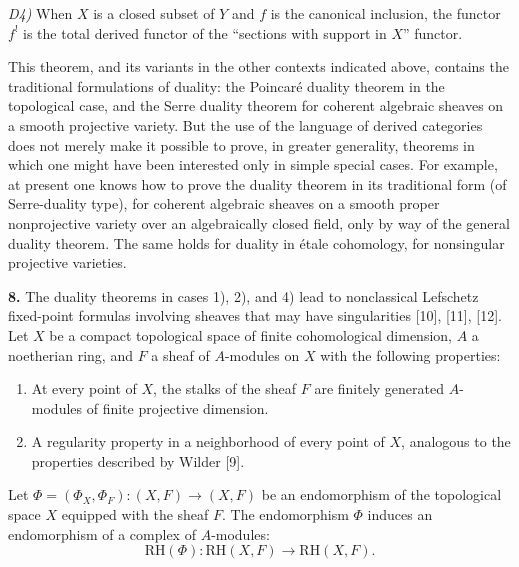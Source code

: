 %
\noindent\textit{D4)} When $X$ is a closed subset of $Y$ and $f$ is the
canonical inclusion, the functor $f^!$ is the total derived functor of the
“sections with support in $X$” functor.

This theorem, and its variants in the other contexts indicated above,
contains the traditional formulations of duality: the Poincaré duality
theorem in the topological case, and the Serre duality theorem for coherent
algebraic sheaves on a smooth projective variety. But the use of the language
of derived categories does not merely make it possible to prove, in greater
generality, theorems in which one might have been interested only in simple
special cases. For example, at present one knows how to prove the duality
theorem in its traditional form (of Serre-duality type), for coherent
algebraic sheaves on a smooth proper nonprojective variety over an
algebraically closed field, only by way of the general duality theorem. The
same holds for duality in étale cohomology, for nonsingular projective
varieties.

\noindent\textbf{8.}\quad
The duality theorems in cases 1), 2), and 4) lead to nonclassical Lefschetz
fixed-point formulas involving sheaves that may have singularities [10],
[11], [12]. Let $X$ be a compact topological space of finite cohomological
dimension, $A$ a noetherian ring, and $F$ a sheaf of $A$-modules on $X$ with
the following properties:

\begin{enumerate}
\renewcommand{\labelenumi}{\alph{enumi})}
\item At every point of $X$, the stalks of the sheaf $F$ are finitely
generated $A$-modules of finite projective dimension.

\item A regularity property in a neighborhood of every point of $X$,
analogous to the properties described by Wilder [9].
\end{enumerate}

Let $\Phi=(\Phi_X,\Phi_F)\colon(X,F)\longrightarrow(X,F)$ be an endomorphism
of the topological space $X$ equipped with the sheaf $F$. The endomorphism
$\Phi$ induces an endomorphism of a complex of $A$-modules:
\[
\mathrm{RH}(\Phi)\colon
\mathrm{RH}(X,F)\longrightarrow\mathrm{RH}(X,F).
\]

